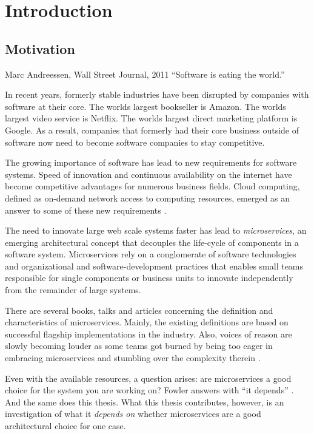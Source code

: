 \chapter{Introduction}

\section{Motivation}
\label{intro:motivation}
\begin{chapquote}{Marc Andreessen, Wall Street Journal, 2011}
``Software is eating the world.''
\end{chapquote}

In recent years, formerly stable industries have been disrupted by companies with software at their core.
The worlds largest bookseller is Amazon.
The worlds largest video service is Netflix.
The worlds largest direct marketing platform is Google.
As a result, companies that formerly had their core business outside of software now need to become software companies to stay competitive. \cite{Andreessen2011}

The growing importance of software has lead to new requirements for software systems.
Speed of innovation and continuous availability on the internet have become competitive advantages for numerous business fields.
Cloud computing, defined as on-demand network access to computing resources, emerged as an answer to some of these new requirements \cite{DefCC2011}. 

The need to innovate large web scale systems faster has lead to \textit{microservices}, an emerging architectural concept that decouples the life-cycle of components in a software system.
Microservices rely on a conglomerate of software technologies and organizational and software-development practices that enables small teams responsible for single components or business units to innovate independently from the remainder of large systems.

There are several books, talks and articles concerning the definition and characteristics of microservices.
Mainly, the existing definitions are based on successful flagship implementations in the industry.
Also, voices of reason are slowly becoming louder as some teams got burned by being too eager in embracing microservices and stumbling over the complexity therein \cite{FowlerMSPremium2014}.

Even with the available resources, a question arises: are microservices a good choice for the system you are working on?
Fowler answers with ``it depends'' \cite{FowlerMSPremium2014}.
And the same does this thesis.
What this thesis contributes, however, is an investigation of what it \textit{depends on} whether microservices are a good architectural choice for one case.

